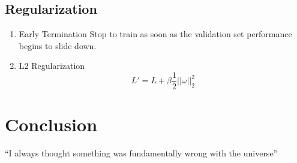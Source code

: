 \documentclass{article}
\begin{document}
\subsection{Regularization}

\begin{enumerate}
	\item Early Termination
	Stop to train as soon as the validation set performance begins to slide down.
	\item L2 Regularization
	$$ L' = L + \beta \frac{1}{2} ||\omega||_{2}^2 $$

\end{enumerate}

\section{Conclusion}
``I always thought something was fundamentally wrong with the universe'' \citep{adams1995hitchhiker}



\end{document}
